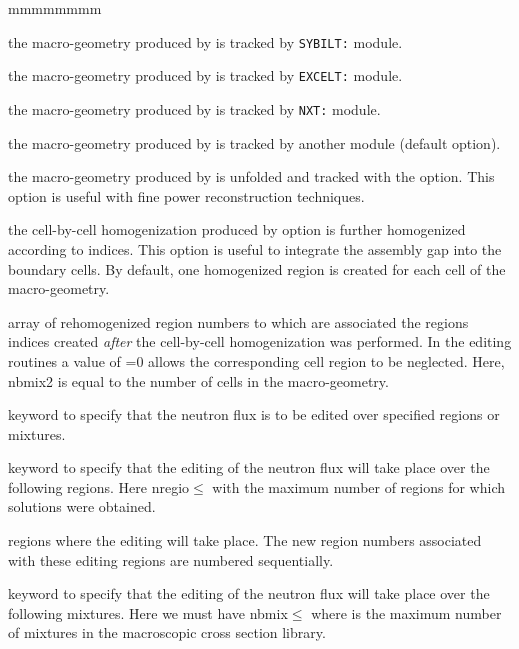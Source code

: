 \begin{ListeDeDescription}{mmmmmmmm}
\item[\moc{SYBIL}] the macro-geometry produced by  is tracked by {\tt SYBILT:} module.

\item[\moc{EXCELL}] the macro-geometry produced by  is tracked by {\tt EXCELT:} module.

\item[\moc{NXT}] the macro-geometry produced by  is tracked by {\tt NXT:} module.

\item[\moc{DEFAULT}] the macro-geometry produced by  is tracked by another module (default option).

\item[\moc{UNFOLD}] the macro-geometry produced by  is unfolded and tracked with the  option. This option is
useful with fine power reconstruction techniques.

\item[\moc{REMIX}] the cell-by-cell homogenization produced by option  is further homogenized according to 
indices. This option is useful to integrate the assembly gap into the boundary cells. By default, one homogenized region is created
for each cell of the macro-geometry.

\item[\dusa{imixm2}] array of rehomogenized region numbers to which are associated the regions indices created {\sl after}
the cell-by-cell homogenization was performed. In the editing routines a value of =0 allows the corresponding
cell region to be neglected. Here, nbmix2 is equal to the number of cells in the macro-geometry.

\item[\moc{TAKE}] keyword to specify that the neutron flux is to be edited
over specified regions or mixtures. 

\item[\moc{REGI}] keyword to specify that the editing of the neutron flux will
take place over the following regions. Here nregio$\le$
with  the maximum number of regions for which solutions were
obtained.

\item[\dusa{iregt}] regions where the editing will take place. The new region
numbers associated with these editing regions are numbered sequentially.

\item[\moc{MIX}] keyword to specify that the editing of the neutron
flux will take place over the following mixtures. Here
we must have nbmix$\le$ where  is the maximum number
of mixtures in the macroscopic cross section library.  


\end{ListeDeDescription}
